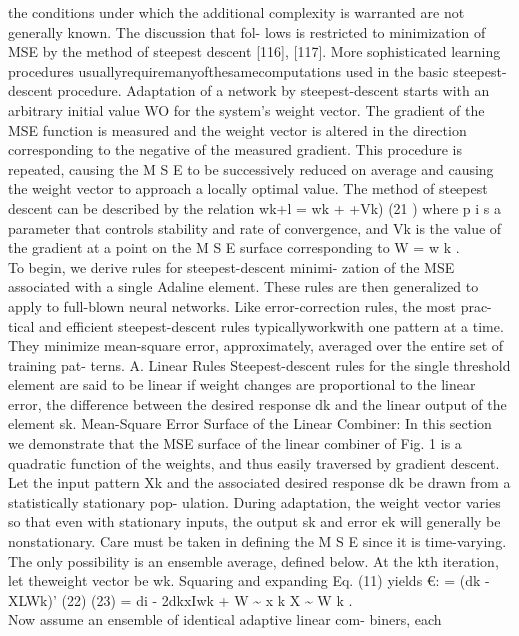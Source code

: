 the conditions under which the additional complexity is warranted are
not generally known. The discussion that fol- lows is restricted to
minimization of MSE by the method of steepest descent {[}116{]},
{[}117{]}. More sophisticated learning procedures
usuallyrequiremanyofthesamecomputations used in the basic
steepest-descent procedure. Adaptation of a network by steepest-descent
starts with an arbitrary initial value WO for the system's weight
vector. The gradient of the MSE function is measured and the weight
vector is altered in the direction corresponding to the negative of the
measured gradient. This procedure is repeated, causing the M S E to be
successively reduced on average and causing the weight vector to
approach a locally optimal value. The method of steepest descent can be
described by the relation wk+l = wk + +Vk) (21 ) where p i s a parameter
that controls stability and rate of convergence, and Vk is the value of
the gradient at a point on the M S E surface corresponding to W = w k
.\\
To begin, we derive rules for steepest-descent minimi- zation of the MSE
associated with a single Adaline element. These rules are then
generalized to apply to full-blown neural networks. Like
error-correction rules, the most prac- tical and efficient
steepest-descent rules typicallyworkwith one pattern at a time. They
minimize mean-square error, approximately, averaged over the entire set
of training pat- terns. A. Linear Rules Steepest-descent rules for the
single threshold element are said to be linear if weight changes are
proportional to the linear error, the difference between the desired
response dk and the linear output of the element sk. Mean-Square Error
Surface of the Linear Combiner: In this section we demonstrate that the
MSE surface of the linear combiner of Fig. 1 is a quadratic function of
the weights, and thus easily traversed by gradient descent. Let the
input pattern Xk and the associated desired response dk be drawn from a
statistically stationary pop- ulation. During adaptation, the weight
vector varies so that even with stationary inputs, the output sk and
error ek will generally be nonstationary. Care must be taken in defining
the M S E since it is time-varying. The only possibility is an ensemble
average, defined below. At the kth iteration, let theweight vector be
wk. Squaring and expanding Eq. (11) yields €: = (dk - XLWk)' (22) (23) =
di - 2dkxIwk + W \textasciitilde{} x k X \textasciitilde{} W k .\\
Now assume an ensemble of identical adaptive linear com- biners, each
